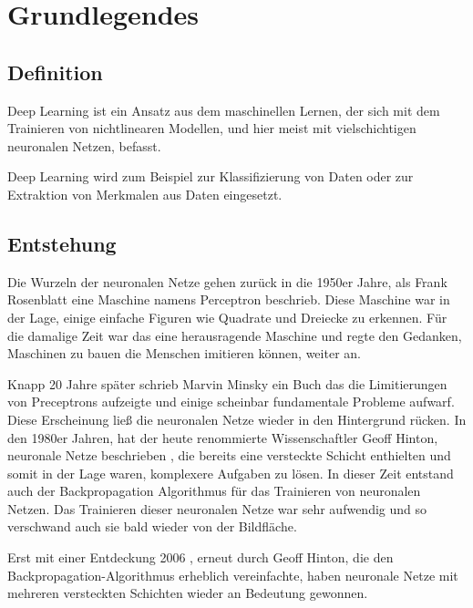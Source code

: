 \chapter{Grundlegendes}
\label{cha:grundlegendes}

\section{Definition}

Deep Learning ist ein Ansatz aus dem maschinellen Lernen, der sich mit dem Trainieren von nichtlinearen Modellen, und hier meist mit vielschichtigen neuronalen Netzen, befasst. 

Deep Learning wird zum Beispiel zur Klassifizierung von Daten oder zur Extraktion von Merkmalen aus Daten eingesetzt.

\section{Entstehung}
\label{cha:entstehung}

Die Wurzeln der neuronalen Netze gehen zurück in die 1950er Jahre, als Frank Rosenblatt eine Maschine namens Perceptron \citep{Perceptron} beschrieb. Diese Maschine war in der Lage, einige einfache Figuren wie Quadrate und Dreiecke zu erkennen. Für die damalige Zeit war das eine herausragende Maschine und regte den Gedanken, Maschinen zu bauen die Menschen imitieren können, weiter an.

Knapp 20 Jahre später schrieb Marvin Minsky \citep{PerceptronsMinsky} ein Buch das die Limitierungen von Preceptrons aufzeigte und einige scheinbar fundamentale Probleme aufwarf. Diese Erscheinung ließ die neuronalen Netze wieder in den Hintergrund rücken.
In den 1980er Jahren, hat der heute renommierte Wissenschaftler Geoff Hinton, neuronale Netze beschrieben \citep{BackpropagationEarly}, die bereits eine versteckte Schicht enthielten und somit in der Lage waren, komplexere Aufgaben zu lösen. In dieser Zeit entstand auch der Backpropagation Algorithmus für das Trainieren von neuronalen Netzen. %
Das Trainieren dieser neuronalen Netze war sehr aufwendig und so verschwand auch sie bald wieder von der Bildfläche. 

Erst mit einer Entdeckung 2006 \citep{BackpropagationFast}, erneut durch Geoff Hinton, die den Backpropagation-Algorithmus erheblich vereinfachte, haben neuronale Netze mit mehreren versteckten Schichten wieder an Bedeutung gewonnen. 

